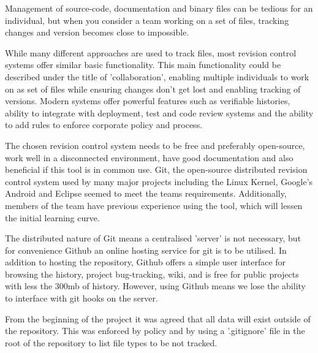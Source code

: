 Management of source-code, documentation and binary files can be tedious for an individual, but when you consider a team working on a set of files, tracking changes and version becomes close to impossible.

While many different approaches are used to track files, most revision control systems offer
similar basic functionality. This main functionality could be described under
the title of 'collaboration', enabling multiple individuals to work on as set of
files while ensuring changes don't get lost and enabling tracking of versions.
Modern systems offer powerful features such as verifiable histories, ability to integrate with deployment, test and code review systems and the ability to add rules to enforce corporate policy and process.

The chosen revision control system needs to be free and preferably open-source,
work well in a disconnected environment, have good documentation and also
beneficial if this tool is in common use. Git\cite{website:git_scm}, the
open-source distributed revision control system used by many major projects
including the Linux Kernel, Google's Android and Eclipse seemed to meet the
teams requirements. Additionally, members of the team have previous experience using the tool, which will lessen the initial learning curve.

The distributed nature of Git means a centralised 'server' is not necessary,
but for convenience Github\cite{website:github} an online hosting service for
git is to be utilised. In addition to hosting the repository, Github offers a
simple user interface for browsing the history, project bug-tracking, wiki, and
is free for public projects with less the 300mb of history. However, using
Github means we lose the ability to interface with git hooks on the server. 

From the beginning of the project it was agreed that all data will exist
outside of the repository. This was enforced by policy and by using a
'.gitignore' file in the root of the repository to list file types to be not tracked.
